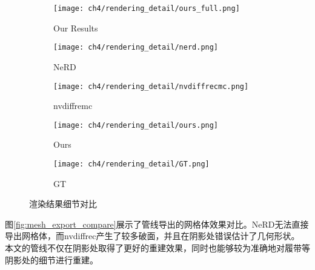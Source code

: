 \begin{figure}[H]
  \centering
  \begin{subfigure}[c]{0.32\textwidth}
    \centering
    \texttt{[image: ch4/rendering\_detail/ours\_full.png]}
    \caption{Our Results}
  \end{subfigure}
  \begin{subfigure}[c]{0.16\textwidth}
    \centering
    \texttt{[image: ch4/rendering\_detail/nerd.png]}
    \caption{NeRD}
  \end{subfigure}
  \hspace{0.1mm}
  \begin{subfigure}[c]{0.16\textwidth}
    \centering
    \texttt{[image: ch4/rendering\_detail/nvdiffrecmc.png]}
    \caption{nvdiffremc}
  \end{subfigure}
  \hspace{0.1mm}
  \begin{subfigure}[c]{0.16\textwidth}
    \centering
    \texttt{[image: ch4/rendering\_detail/ours.png]}
    \caption{Ours}
  \end{subfigure}
  \hspace{0.1mm}
  \begin{subfigure}[c]{0.16\textwidth}
    \centering
    \texttt{[image: ch4/rendering\_detail/GT.png]}
    \caption{GT}
  \end{subfigure}
  \caption{渲染结果细节对比}
  \label{fig:rendering_detail_compare}
\end{figure}

图\ref{fig:mesh_export_compare}展示了管线导出的网格体效果对比。NeRD无法直接导出网格体，而nvdiffrec产生了较多破面，并且在阴影处错误估计了几何形状。
本文的管线不仅在阴影处取得了更好的重建效果，同时也能够较为准确地对履带等阴影处的细节进行重建。

